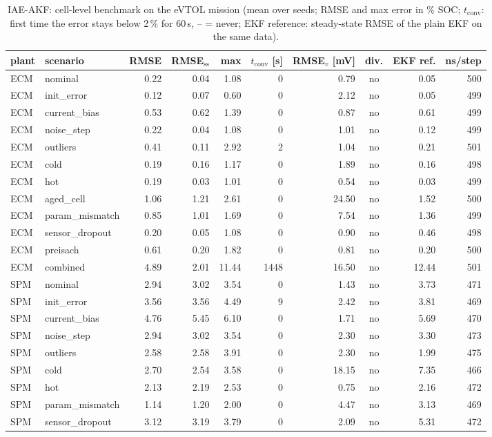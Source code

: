 \begin{table}[H]\centering\footnotesize\setlength{\tabcolsep}{4pt}
\caption{IAE-AKF: cell-level benchmark on the eVTOL mission (mean over seeds; RMSE and max error in \% SOC; $t_\mathrm{conv}$: first time the error stays below 2\,\% for 60\,s, -- = never; EKF reference: steady-state RMSE of the plain EKF on the same data).}\label{tab:cell_IAEAKF}
\begin{tabular}{llrrrrrcrr}\toprule
plant & scenario & RMSE & RMSE$_\mathrm{ss}$ & max & $t_\mathrm{conv}$ [s] & RMSE$_v$ [mV] & div. & EKF ref. & ns/step \\ \midrule
ECM & nominal & 0.22 & 0.04 & 1.08 & 0 & 0.79 & no & 0.05 & 500 \\
ECM & init\_error & 0.12 & 0.07 & 0.60 & 0 & 2.12 & no & 0.05 & 499 \\
ECM & current\_bias & 0.53 & 0.62 & 1.39 & 0 & 0.87 & no & 0.61 & 499 \\
ECM & noise\_step & 0.22 & 0.04 & 1.08 & 0 & 1.01 & no & 0.12 & 499 \\
ECM & outliers & 0.41 & 0.11 & 2.92 & 2 & 1.04 & no & 0.21 & 501 \\
ECM & cold & 0.19 & 0.16 & 1.17 & 0 & 1.89 & no & 0.16 & 498 \\
ECM & hot & 0.19 & 0.03 & 1.01 & 0 & 0.54 & no & 0.03 & 499 \\
ECM & aged\_cell & 1.06 & 1.21 & 2.61 & 0 & 24.50 & no & 1.52 & 500 \\
ECM & param\_mismatch & 0.85 & 1.01 & 1.69 & 0 & 7.54 & no & 1.36 & 499 \\
ECM & sensor\_dropout & 0.20 & 0.05 & 1.08 & 0 & 0.90 & no & 0.46 & 498 \\
ECM & preisach & 0.61 & 0.20 & 1.82 & 0 & 0.81 & no & 0.20 & 500 \\
ECM & combined & 4.89 & 2.01 & 11.44 & 1448 & 16.50 & no & 12.44 & 501 \\
\midrule
SPM & nominal & 2.94 & 3.02 & 3.54 & 0 & 1.43 & no & 3.73 & 471 \\
SPM & init\_error & 3.56 & 3.56 & 4.49 & 9 & 2.42 & no & 3.81 & 469 \\
SPM & current\_bias & 4.76 & 5.45 & 6.10 & 0 & 1.71 & no & 5.69 & 470 \\
SPM & noise\_step & 2.94 & 3.02 & 3.54 & 0 & 2.30 & no & 3.30 & 473 \\
SPM & outliers & 2.58 & 2.58 & 3.91 & 0 & 2.30 & no & 1.99 & 475 \\
SPM & cold & 2.70 & 2.54 & 3.58 & 0 & 18.15 & no & 7.35 & 466 \\
SPM & hot & 2.13 & 2.19 & 2.53 & 0 & 0.75 & no & 2.16 & 472 \\
SPM & param\_mismatch & 1.14 & 1.20 & 2.00 & 0 & 4.47 & no & 3.13 & 469 \\
SPM & sensor\_dropout & 3.12 & 3.19 & 3.79 & 0 & 2.09 & no & 5.31 & 472 \\
\bottomrule\end{tabular}\end{table}
